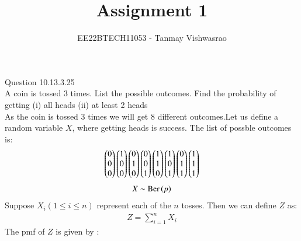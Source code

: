 \documentclass[journal,12pt,twocolumn]{IEEEtran}
\theoremstyle{remark}
\begin{document}
\let\vec\mathbf





\vspace{3cm}

\title{
Assignment 1
}
\author{ EE22BTECH11053 - Tanmay Vishwasrao%
	
}	

\maketitle


\newpage


\bigskip

\renewcommand{\thefigure}{\theenumi}
\renewcommand{\thetable}{\theenumi}
Question 10.13.3.25\\
A coin is tossed 3 times. List the possible outcomes. Find the probability of getting
(i) all heads (ii) at least 2 heads\\
\solution
As the coin is tossed 3 times we will get 8 different outcomes.Let us define a random variable $X$, where getting heads is success. The list of possble outcomes is:
\begin{align}
\begin{pmatrix}0 \\ 0 \\ 0\end{pmatrix} \begin{pmatrix}1 \\ 0 \\ 0\end{pmatrix} \begin{pmatrix}0 \\ 1 \\ 0\end{pmatrix} \begin{pmatrix}0 \\ 0 \\ 1\end{pmatrix} \begin{pmatrix}1 \\ 1 \\ 0\end{pmatrix} \begin{pmatrix}1 \\ 0 \\ 1\end{pmatrix} \begin{pmatrix}0 \\ 1 \\ 1\end{pmatrix} \begin{pmatrix}1 \\ 1 \\ 1\end{pmatrix}
\end{align}
\begin{align}
X \sim \text{Ber}\left(p\right)\\
\end{align}
Suppose $X_i (1 \leq i \leq n)$ represent each of the $n$ tosses. Then we can define $Z$ as:
\begin{align}
Z = \sum_{i=1}^nX_i
\end{align}
The pmf of $Z$ is given by : 
\end{document}
